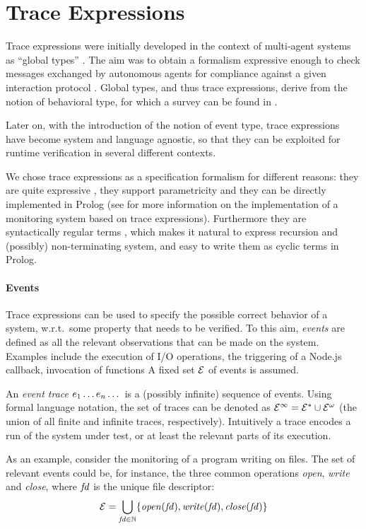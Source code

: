 \section{Trace Expressions}
\label{sec:trace}
Trace expressions were initially developed in the context of multi-agent systems as ``global types'' \cite{AnconaDM12}.
The aim was to obtain a formalism expressive enough to check messages exchanged by autonomous agents for compliance against a given interaction protocol \cite{AnconaBFMT14, BriolaMA14}.
Global types, and thus trace expressions, derive from the notion of behavioral type, for which a survey can be found in \cite{AnconaBB0CDGGGH16}.

Later on, with the introduction of the notion of event type, trace expressions have become system and language agnostic, so that they can be exploited for runtime verification in several different contexts.

We chose trace expressions as a specification formalism for different reasons: they are quite expressive \cite{ancona2016comparing}, they support parametricity \cite{AnconaFM17} and they can be directly implemented in Prolog (see \cite{TowardsIoT17} for more information on the implementation of a monitoring system based on trace expressions).
Furthermore they are syntactically regular terms \cite{Courcelle83}, which makes it natural to express recursion and (possibly) non-terminating system, and easy to write them as cyclic terms in Prolog.

\paragraph{Events}
Trace expressions can be used to specify the possible correct behavior of a system, w.r.t.\ some property that needs to be verified.
To this aim, \emph{events} are defined as all the relevant observations that can be made on the system.
Examples include the execution of I/O operations, the triggering of a Node.js callback, invocation of functions\textellipsis{} A fixed set \(\mathcal{E}\) of events is assumed.

An \emph{event trace} \(e_1\dots e_n\dots\) is a (possibly infinite) sequence of events.
Using formal language notation, the set of traces can be denoted as \(\mathcal{E}^\infty = \mathcal{E}^* \cup \mathcal{E}^\omega\) (the union of all finite and infinite traces, respectively).
Intuitively a trace encodes a run of the system under test, or at least the relevant parts of its execution.

As an example, consider the monitoring of a program writing on files.
The set of relevant events could be, for instance, the three common operations \emph{open}, \emph{write} and \emph{close}, where \(\mathit{fd}\) is the unique file descriptor:
\begin{equation}\label{eq:filedomain}
\mathcal{E} = \bigcup_{\mathit{fd} \in \mathbb{N}} \{\mathit{open}(\mathit{fd}), \mathit{write}(\mathit{fd}), \mathit{close}(\mathit{fd})\}
\end{equation}

